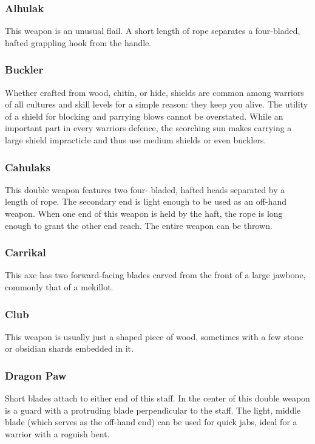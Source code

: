 \begin{multicols}{2}

\subsubsection{Alhulak}
\label{itmmlee:alhulak}
This weapon is an unusual flail. A short length of rope separates
a four-bladed, hafted grappling hook from the handle.

\subsubsection{Buckler}
\label{itmmlee:buckler}
Whether crafted from wood, chitin, or hide, shields are
common among warriors of all cultures and skill levels for
a simple reason: they keep you alive. The utility of a shield
for blocking and parrying blows cannot be overstated. While
an important part in every warriors defence, the scorching sun
makes carrying a large shield impracticle and thus use medium
shields or even bucklers.

\subsubsection{Cahulaks}
\label{itmmlee:cahulaks}
This double weapon features two four-
bladed, hafted heads separated by a length of rope.
The secondary end is light enough to be used as an
off-hand weapon. When one end of this weapon is
held by the haft, the rope is long enough to grant the
other end reach. The entire weapon can be thrown.

\subsubsection{Carrikal}
\label{itmmlee:carrikal}
This axe has two forward-facing blades carved from the front
of a large jawbone, commonly that of a mekillot.

\subsubsection{Club}
\label{itmmlee:club}
This weapon is usually just a shaped piece of wood, sometimes
with a few stone or obsidian shards embedded in it.

\subsubsection{Dragon Paw}
\label{itmmlee:dragonpaw}
Short blades attach to either end
of this staff. In the center of this double weapon is a
guard with a protruding blade perpendicular to the
staff. The light, middle blade (which serves as the
off-hand end) can be used for quick jabs, ideal for a
warrior with a roguish bent.


\end{multicols}
